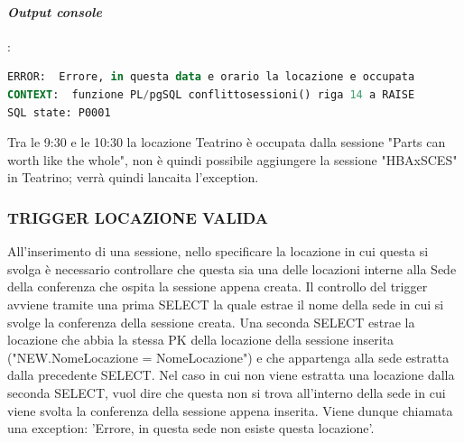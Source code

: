 \documentclass[a4page]{article}
\begin{document}
\paragraph{\textit{Output console}}:
\begin{lstlisting}[language=SQL,
        deletekeywords={IDENTITY,INT},
        morekeywords={clustered},    
        framesep=10pt,
        framextopmargin=10pt]
ERROR:  Errore, in questa data e orario la locazione e occupata
CONTEXT:  funzione PL/pgSQL conflittosessioni() riga 14 a RAISE
SQL state: P0001
\end{lstlisting}
\vspace{0.3cm}
Tra le 9:30 e le 10:30 la locazione Teatrino è occupata dalla sessione "Parts can worth like the whole", non è quindi possibile aggiungere la sessione "HBAxSCES" in Teatrino; verrà quindi lancaita l'exception.
\subsubsection{TRIGGER LOCAZIONE VALIDA}
All'inserimento di una sessione, nello specificare la locazione in cui questa si svolga è necessario controllare che questa sia una delle locazioni interne alla Sede della conferenza che ospita la sessione appena creata. Il controllo del trigger avviene tramite una prima SELECT la quale estrae il nome della sede in cui si svolge la conferenza della sessione creata. Una seconda SELECT estrae la locazione che abbia la stessa PK della locazione della sessione inserita ("NEW.NomeLocazione = NomeLocazione") e che appartenga alla sede estratta dalla precedente SELECT. Nel caso in cui non viene estratta una locazione dalla seconda SELECT, vuol dire che questa non si trova all'interno della sede in cui viene svolta la conferenza della sessione appena inserita.
Viene dunque chiamata una exception: 'Errore, in questa sede non esiste questa locazione'.
\vspace{1cm}
\end{document}
